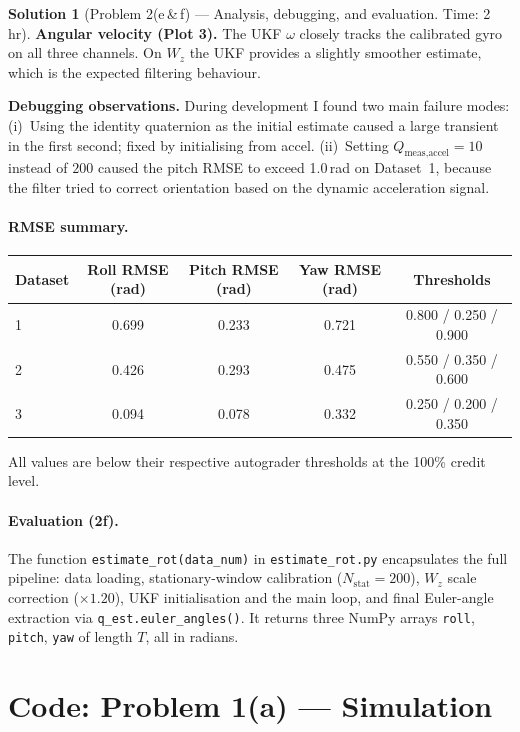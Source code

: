 \documentclass[11pt, reqno, letterpaper]{amsart}
\theoremstyle{plain}
\theoremstyle{definition}
\newtheorem{solution}[theorem]{Solution}
\begin{document}
\begin{solution}[Problem 2(e\,\&\,f) — Analysis, debugging, and evaluation. Time: 2 hr]
\textbf{Angular velocity (Plot 3).}
The UKF $\omega$ closely tracks the calibrated gyro on all three channels.
On $W_z$ the UKF provides a slightly smoother estimate, which is the
expected filtering behaviour.

\textbf{Debugging observations.}
During development I found two main failure modes:
(i)~Using the identity quaternion as the initial estimate caused a large
    transient in the first second; fixed by initialising from accel.
(ii)~Setting $Q_\text{meas,accel}=10$ instead of $200$ caused the
     pitch RMSE to exceed 1.0\,rad on Dataset~1, because the filter
     tried to correct orientation based on the dynamic acceleration
     signal.

\paragraph{RMSE summary.}
\begin{center}\small
\begin{tabular}{lcccc}
  \toprule
  Dataset & Roll RMSE (rad) & Pitch RMSE (rad) & Yaw RMSE (rad) & Thresholds \\
  \midrule
  1 & 0.699 & 0.233 & 0.721 & 0.800 / 0.250 / 0.900 \\
  2 & 0.426 & 0.293 & 0.475 & 0.550 / 0.350 / 0.600 \\
  3 & 0.094 & 0.078 & 0.332 & 0.250 / 0.200 / 0.350 \\
  \bottomrule
\end{tabular}
\end{center}
All values are below their respective autograder thresholds at the 100\%
credit level.

\paragraph{Evaluation (2f).}
The function \texttt{estimate\_rot(data\_num)} in \texttt{estimate\_rot.py}
encapsulates the full pipeline: data loading, stationary-window calibration
($N_\text{stat}=200$), $W_z$ scale correction ($\times1.20$), UKF initialisation
and the main loop, and final Euler-angle extraction via
\texttt{q\_est.euler\_angles()}.
It returns three NumPy arrays \texttt{roll}, \texttt{pitch}, \texttt{yaw}
of length $T$, all in radians.
\end{solution}

\appendix
\section{Code: Problem 1(a) — Simulation}

\end{document}
